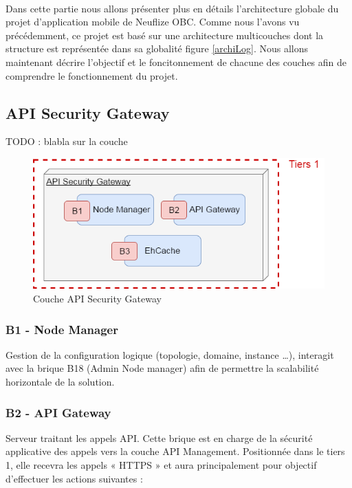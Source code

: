 \paragraph{}
Dans cette partie nous allons présenter plus en détails l'architecture globale du projet d'application mobile de Neuflize OBC. Comme nous l'avons vu précédemment, ce projet est basé sur une architecture multicouches dont la structure est représentée dans sa globalité figure \ref{archiLog}. Nous allons maintenant décrire l'objectif et le foncitonnement de chacune des couches afin de comprendre le fonctionnement du projet.

\subsection{API Security Gateway}
	TODO : blabla sur la couche
	
\begin{figure}[H]
	\includegraphics[scale=0.5]{images/travailNeuflizeOBC/architecture/coucheSecurity.png}
	\centering
	\caption{Couche API Security Gateway}
	\label{coucheSecurity}
\end{figure}

	\subsubsection{B1 - Node Manager}
	Gestion de la configuration logique (topologie, domaine, instance …), interagit avec la brique B18 (Admin Node manager) afin de permettre la scalabilité horizontale de la solution.
		
	\subsubsection{B2 - API Gateway}
	Serveur traitant les appels API. Cette brique est en charge de la sécurité applicative des appels vers la couche API Management. Positionnée dans le tiers 1, elle recevra les appels « HTTPS » et aura principalement pour objectif d’effectuer les actions suivantes : \\
	
